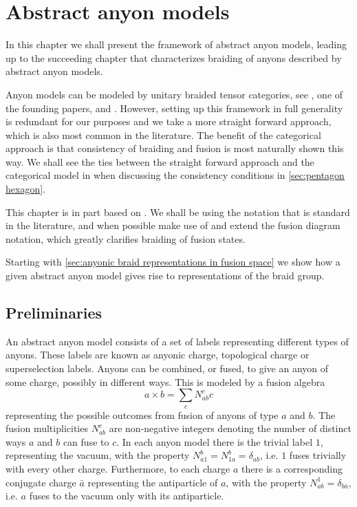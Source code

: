 
\chapter{Abstract anyon models}\label{anyon models}

In this chapter we shall present the framework of abstract anyon models, leading up to the succeeding chapter that characterizes braiding of anyons described by abstract anyon models.

Anyon models can be modeled by unitary braided tensor categories, see \cite{kitaev}, one of the founding papers, and \cite{naaijkens,prakash,tensor categories,tuba}. However, setting up this framework in full generality is redundant for our purposes and we take a more straight forward approach, which is also most common in the literature. The benefit of the categorical approach is that consistency of braiding and fusion is most naturally shown this way. We shall see the ties between the straight forward approach and the categorical model in when discussing the consistency conditions in \cref{sec:pentagon hexagon}.

This chapter is in part based on \cite{preskill,kitaev,bonderson}. We shall be using the notation that is standard in the literature, and when possible make use of and extend the fusion diagram notation, which greatly clarifies braiding of fusion states.

Starting with \cref{sec:anyonic braid representations in fusion space} we show how a given abstract anyon model gives rise to representations of the braid group.

\section{Preliminaries}

An abstract anyon model consists of a set of labels representing different types of anyons. These labels are known as anyonic charge, topological charge or superselection labels. Anyons can be combined, or fused, to give an anyon of some charge, possibly in different ways. This is modeled by a fusion algebra
\begin{equation}
  a \times b = \sum_c N_{ab}^c c
\end{equation}
representing the possible outcomes from fusion of anyons of type $a$ and $b$. The fusion multiplicities $N_{ab}^c$ are non-negative integers denoting the number of distinct ways $a$ and $b$ can fuse to $c$. In each anyon model there is the trivial label $1$, representing the vacuum, with the property $N_{a1}^b = N_{1a}^b = \delta_{ab}$, i.e. $1$ fuses trivially with every other charge. Furthermore, to each charge $a$ there is a corresponding conjugate charge $\bar{a}$ representing the antiparticle of $a$, with the property $N_{ab}^1 = \delta_{b\bar{a}}$, i.e. $a$ fuses to the vacuum only with its antiparticle.

